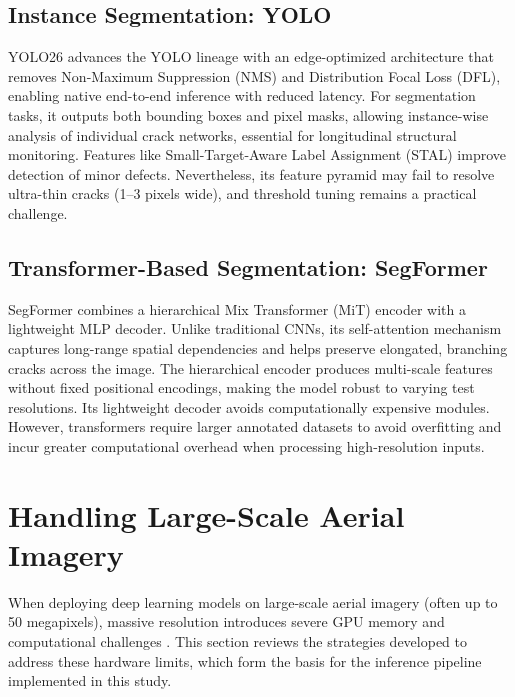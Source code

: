 \newpage

\subsection{Instance Segmentation: YOLO}
\label{subsec:instance_segmentation_yolo}
\hs YOLO26 \cite{31-sapkota-2026-yolo26} advances the YOLO lineage with an edge-optimized architecture that removes Non-Maximum Suppression (NMS) and Distribution Focal Loss (DFL), enabling native end-to-end inference with reduced latency. For segmentation tasks, it outputs both bounding boxes and pixel masks, allowing instance-wise analysis of individual crack networks, essential for longitudinal structural monitoring. Features like Small-Target-Aware Label Assignment (STAL) improve detection of minor defects. Nevertheless, its feature pyramid may fail to resolve ultra-thin cracks (1–3 pixels wide), and threshold tuning remains a practical challenge.

\subsection{Transformer-Based Segmentation: SegFormer}
\label{subsec:transformer_based_segmentation_segformer}
\hs SegFormer \cite{32-xie-2021-segformer} combines a hierarchical Mix Transformer (MiT) encoder with a lightweight MLP decoder. Unlike traditional CNNs, its self-attention mechanism captures long-range spatial dependencies and helps preserve elongated, branching cracks across the image. The hierarchical encoder produces multi-scale features without fixed positional encodings, making the model robust to varying test resolutions. Its lightweight decoder avoids computationally expensive modules. However, transformers require larger annotated datasets to avoid overfitting and incur greater computational overhead when processing high-resolution inputs.

\section{Handling Large-Scale Aerial Imagery}
\label{sec:handling_large_scale_aerial_imagery}
\hs When deploying deep learning models on large-scale aerial imagery (often up to 50 megapixels), massive resolution introduces severe GPU memory and computational challenges \cite{25-akyon-2022-sahi}. This section reviews the strategies developed to address these hardware limits, which form the basis for the inference pipeline implemented in this study.

